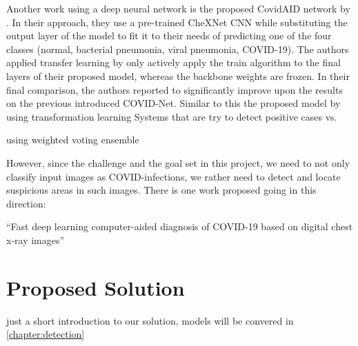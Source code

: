 Another work using a deep neural network is the proposed CovidAID \autocite{mangal2020covidaid} network by \citeauthor{mangal2020covidaid}. In their approach, they use a pre-trained CheXNet \autocite{rajpurkar2017chexnet} \ac{CNN} while substituting the output layer of the model to fit it to their needs of predicting one of the four classes (normal, bacterial pneumonia, viral pneumonia, COVID-19). The authors applied transfer learning by only actively apply the train algorithm to the final layers of their proposed model, whereas the backbone weights are frozen.
In their final comparison, the authors reported to significantly improve upon the results on the previous introduced COVID-Net.
Similar to this the proposed model \autocite{CoronaDLTransfer} by \citeauthor{CoronaDLTransfer} using transformation learning 
Systems that are try to detect positive cases vs. 

using weighted voting ensemble \autocite{livieris2019weighted}

\autocite{brunese2020explainable}

However, since the challenge and the goal set in this project, we need to not only classify input images as COVID-infections, we rather need to detect and locate 
suspicious areas in such images. There is one work proposed going in this direction:

“Fast deep learning computer-aided diagnosis of COVID-19 based on digital chest x-ray images” \autocite{al2021fast}
\section{Proposed Solution}
just a short introduction to our solution, models will be convered in \vref{chapter:detection}